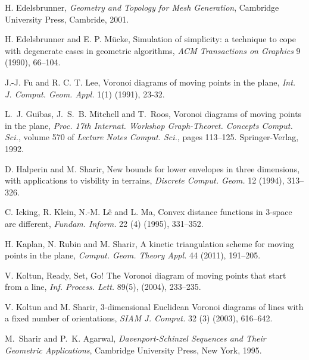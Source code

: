 \documentclass[letter,11pt]{article}
\begin{document}
\begin{thebibliography}{10}
H. Edelsbrunner,
{\em Geometry and Topology for Mesh Generation},
Cambridge University Press, Cambride, 2001.

 H. Edelsbrunner and E. P. M\"{u}cke, Simulation of simplicity: a technique to cope with degenerate cases in geometric algorithms, {\it ACM Transactions on Graphics} 9 (1990), 66--104.

 J.-J. Fu and R. C. T. Lee, Voronoi diagrams of moving points in the plane, {\it Int. J. Comput. Geom. Appl.} 1(1) (1991), 23-32.





L.~J. Guibas, J.~S.~B. Mitchell and T.~Roos,
Voronoi diagrams of moving points in the plane,
{\em Proc. 17th Internat. Workshop Graph-Theoret. Concepts Comput.
Sci.}, volume 570 of {\em Lecture Notes Comput. Sci.}, pages 113--125.
Springer-Verlag, 1992.

D. Halperin and M. Sharir, New bounds for lower envelopes in three dimensions, with applications to visbility in terrains, {\it Discrete Comput. Geom.} 12 (1994), 313--326.

C. Icking, R. Klein, N.-M. L\^{e} and L. Ma,
Convex distance functions in 3-space are different, {\it Fundam. Inform.} 22 (4) (1995), 331--352.

H. Kaplan, N. Rubin and M. Sharir, 
A kinetic triangulation scheme for moving points in the plane, {\it Comput. Geom. Theory Appl.} 44 (2011), 191--205.

 V. Koltun,
Ready, Set, Go! The Voronoi diagram of moving points that start from a line, {\it Inf. Process. Lett.} 89(5), (2004), 233--235.

 V. Koltun and M. Sharir, 3-dimensional Euclidean Voronoi diagrams of lines with a fixed number of orientations, {\it SIAM J. Comput.} 32 (3) (2003), 616--642.



M.~Sharir and P.~K. Agarwal,
{\em Davenport-Schinzel Sequences and Their Geometric Applications},
Cambridge University Press, New York, 1995.

\end{thebibliography}
\end{document}
